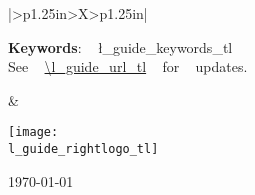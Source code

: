 {\begin{tabularx}{\textwidth}{|>{\centering\arraybackslash}p{1.25in}>{\centering\arraybackslash}X>{\raggedleft\arraybackslash}p{1.25in}|}
\begin{minipage}[c][1\totalheight][b]{3.5in}
\begin{minipage}[t]{1\columnwidth}
\begin{center}
          \par
        \end{center}
      \end{minipage}      
      \smallskip
      \par     
      \begin{flushleft}
        \medskip
        \textbf{Keywords}: ~ \l_guide_keywords_tl \\
        See ~ \url{\l_guide_url_tl} ~ for ~ updates.
        \par
      \end{flushleft}
      \smallskip
    \end{minipage} &
    \begin{minipage}[c]{\linewidth}
      \begin{center}
        \texttt{[image: \\l\_guide\_rightlogo\_tl]}
        \par
        \bigskip
        \crmda\today
      \end{center}%
    \end{minipage} 
    \tabularnewline
    \hline 
  \end{tabularx}
}
\ExplSyntaxOff



\usepackage{xcolor}
\usepackage[unicode=true,pdfusetitle,
bookmarks=true,bookmarksnumbered=false, bookmarksopen=false,
breaklinks=true, pdfborder={0 0 0},
pdfborderstyle={}, backref=false,
colorlinks=true, linkcolor=darkblue, urlcolor=darkblue, 
citecolor=darkblue] {hyperref}

